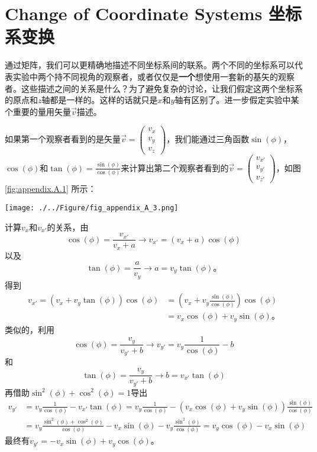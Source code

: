 \section[坐标系变换]{Change of Coordinate Systems 坐标系变换}\label{appendix.A.2}
通过矩阵，我们可以更精确地描述不同坐标系间的联系。两个不同的坐标系可以代表实验中两个持不同视角的观察者，或者仅仅是{\bf 一个}想使用一套新的基矢的观察者。这些描述之间的关系是什么？为了避免复杂的讨论，让我们假定这两个坐标系的原点和$z$轴都是一样的。这样的话就只是$x$和$y$轴有区别了。进一步假定实验中某个重要的量用矢量$\vec{v}$描述。

如果第一个观察者看到的是矢量$\vec{v}= \begin{pmatrix}
v_x \\ v_y \\ v_z
\end{pmatrix}$，我们能通过三角函数$\sin(\phi)$，$\cos(\phi)$和$\tan(\phi)=\frac{\sin(\phi)}{\cos(\phi)}$来计算出第二个观察者看到的$\vec{v}= \begin{pmatrix}
v_{x'} \\ v_{y'} \\ v_{z'}
\end{pmatrix}$，如图\ref{fig:appendix.A.1} 所示：

\texttt{[image: ./../Figure/fig\_appendix\_A\_3.png]}

计算$v_x$和$v_{x'}$的关系，由
\[
\cos(\phi)=\frac{v_{x'}}{v_x+a} \rightarrow v_{x'}=(v_x+a)\cos(\phi)
\]
以及
\[
\tan(\phi)=\frac{a}{v_y}\rightarrow a=v_y\tan(\phi)\text{。}
\]
得到
\[
\begin{aligned}
v_{x'}=(v_x+v_y\tan(\phi))\cos(\phi)&=\left(v_x+v_y\frac{\sin(\phi)}{\cos(\phi)}\right)\cos(\phi) \\
 & = v_x\cos(\phi)+v_y\sin(\phi)\text{。}
\end{aligned}
\]
类似的，利用
\[
\cos(\phi) = \frac{v_y}{v_{y'}+b}\rightarrow v_{y'}=v_y\frac{1}{\cos(\phi)}-b
\]
和
\[
\tan(\phi)=\frac{v_y}{v_{y'}+b}\rightarrow b=v_{x'}\tan(\phi)
\]
再借助$\sin^2(\phi)+\cos^2(\phi)=1$导出
\[\begin{split}
v_{y'}&=v_y\frac{1}{\cos(\phi)}-v_{x'}\tan(\phi)=v_y\frac{1}{\cos(\phi)}-(v_x\cos(\phi)+v_y\sin(\phi))\frac{\sin(\phi)}{\cos(\phi)}  \\
&= v_y\frac{\sin^2(\phi)+\cos^2(\phi)}{\cos(\phi)}-v_x\sin(\phi)-v_y\frac{\sin^2(\phi)}{\cos(\phi)} = v_y\cos(\phi)-v_x\sin(\phi)
\end{split}\]
最终有$v_{y'}=-v_x\sin(\phi)+v_y\cos(\phi)$。


